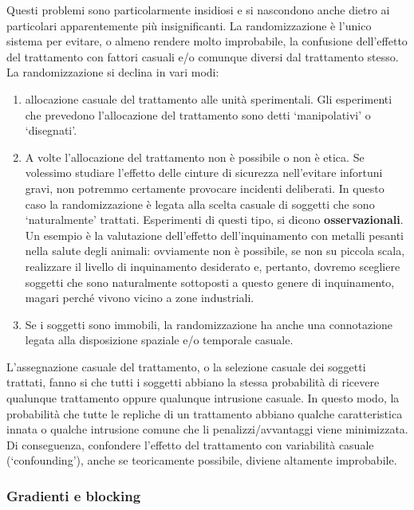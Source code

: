 \documentclass[a4paper,12pt,oneside]{book}
\providecommand{\tightlist}{%
  \setlength{\itemsep}{0pt}\setlength{\parskip}{0pt}}
\theoremstyle{definition}
\theoremstyle{definition}
\theoremstyle{definition}
\theoremstyle{remark}
\begin{document}
Questi problemi sono particolarmente insidiosi e si nascondono anche
dietro ai particolari apparentemente più insignificanti. La
randomizzazione è l'unico sistema per evitare, o almeno rendere molto
improbabile, la confusione dell'effetto del trattamento con fattori
casuali e/o comunque diversi dal trattamento stesso. La randomizzazione
si declina in vari modi:

\begin{enumerate}
\def\labelenumi{\arabic{enumi}.}
\tightlist
\item
  allocazione casuale del trattamento alle unità sperimentali. Gli
  esperimenti che prevedono l'allocazione del trattamento sono detti
  `manipolativi' o `disegnati'.
\item
  A volte l'allocazione del trattamento non è possibile o non è etica.
  Se volessimo studiare l'effetto delle cinture di sicurezza
  nell'evitare infortuni gravi, non potremmo certamente provocare
  incidenti deliberati. In questo caso la randomizzazione è legata alla
  scelta casuale di soggetti che sono `naturalmente' trattati.
  Esperimenti di questi tipo, si dicono \textbf{osservazionali}. Un
  esempio è la valutazione dell'effetto dell'inquinamento con metalli
  pesanti nella salute degli animali: ovviamente non è possibile, se non
  su piccola scala, realizzare il livello di inquinamento desiderato e,
  pertanto, dovremo scegliere soggetti che sono naturalmente sottoposti
  a questo genere di inquinamento, magari perché vivono vicino a zone
  industriali.
\item
  Se i soggetti sono immobili, la randomizzazione ha anche una
  connotazione legata alla disposizione spaziale e/o temporale casuale.
\end{enumerate}

L'assegnazione casuale del trattamento, o la selezione casuale dei
soggetti trattati, fanno si che tutti i soggetti abbiano la stessa
probabilità di ricevere qualunque trattamento oppure qualunque
intrusione casuale. In questo modo, la probabilità che tutte le repliche
di un trattamento abbiano qualche caratteristica innata o qualche
intrusione comune che li penalizzi/avvantaggi viene minimizzata. Di
conseguenza, confondere l'effetto del trattamento con variabilità
casuale (`confounding'), anche se teoricamente possibile, diviene
altamente improbabile.

\subsubsection{Gradienti e blocking}\label{gradienti-e-blocking}
\end{document}

